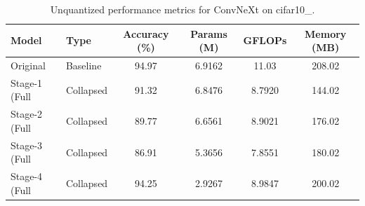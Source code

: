 \begin{table}
\caption{Unquantized performance metrics for ConvNeXt on cifar10_.}
\label{tab:ConvNeXt_cifar10__unquant}
\begin{tabular}{llcccc}
\toprule
Model & Type & Accuracy (\%) & Params (M) & GFLOPs & Memory (MB) \\
\midrule
Original & Baseline & 94.97 & 6.9162 & 11.03 & 208.02 \\
Stage-1 (Full & Collapsed & 91.32 & 6.8476 & 8.7920 & 144.02 \\
Stage-2 (Full & Collapsed & 89.77 & 6.6561 & 8.9021 & 176.02 \\
Stage-3 (Full & Collapsed & 86.91 & 5.3656 & 7.8551 & 180.02 \\
Stage-4 (Full & Collapsed & 94.25 & 2.9267 & 8.9847 & 200.02 \\
\bottomrule
\end{tabular}
\end{table}
